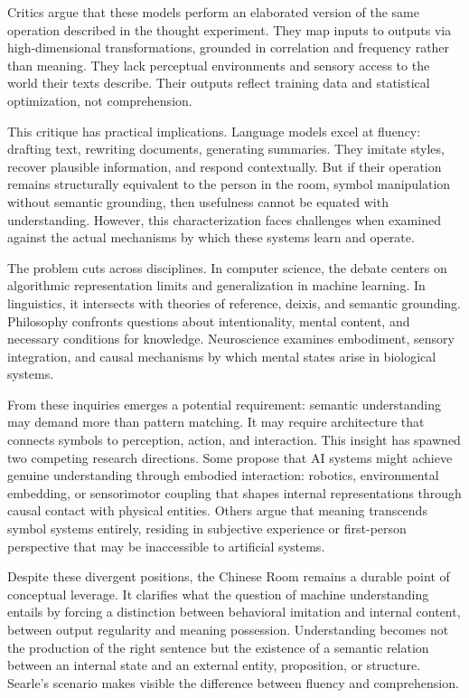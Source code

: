 Critics argue that these models perform an elaborated version of the same operation described in the thought experiment. They map inputs to outputs via high-dimensional transformations, grounded in correlation and frequency rather than meaning. They lack perceptual environments and sensory access to the world their texts describe. Their outputs reflect training data and statistical optimization, not comprehension.

This critique has practical implications. Language models excel at fluency: drafting text, rewriting documents, generating summaries. They imitate styles, recover plausible information, and respond contextually. But if their operation remains structurally equivalent to the person in the room, symbol manipulation without semantic grounding, then usefulness cannot be equated with understanding. However, this characterization faces challenges when examined against the actual mechanisms by which these systems learn and operate.

The problem cuts across disciplines. In computer science, the debate centers on algorithmic representation limits and generalization in machine learning. In linguistics, it intersects with theories of reference, deixis, and semantic grounding. Philosophy confronts questions about intentionality, mental content, and necessary conditions for knowledge. Neuroscience examines embodiment, sensory integration, and causal mechanisms by which mental states arise in biological systems.

From these inquiries emerges a potential requirement: semantic understanding may demand more than pattern matching. It may require architecture that connects symbols to perception, action, and interaction. This insight has spawned two competing research directions. Some propose that AI systems might achieve genuine understanding through embodied interaction: robotics, environmental embedding, or sensorimotor coupling that shapes internal representations through causal contact with physical entities. Others argue that meaning transcends symbol systems entirely, residing in subjective experience or first-person perspective that may be inaccessible to artificial systems.

Despite these divergent positions, the Chinese Room remains a durable point of conceptual leverage. It clarifies what the question of machine understanding entails by forcing a distinction between behavioral imitation and internal content, between output regularity and meaning possession. Understanding becomes not the production of the right sentence but the existence of a semantic relation between an internal state and an external entity, proposition, or structure. Searle's scenario makes visible the difference between fluency and comprehension.

